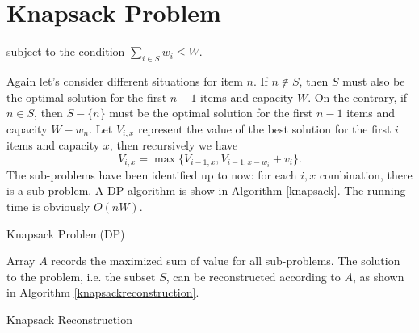 \section{Knapsack Problem}
\begin{description}
 subject to the condition $\sum\limits_{i\in S}w_i\leq W$.
\end{description}
Again let's consider different situations for item $n$. If $n\notin S$, then $S$ must also be the optimal solution for the first $n-1$ items and capacity $W$. On the contrary, if $n\in S$, then $S-\{n\}$ must be the optimal solution for the first $n-1$ items and capacity $W-w_n$. Let $V_{i,x}$ represent the value of the best solution for the first $i$ items and capacity $x$, then recursively we have 
$$V_{i,x}=\max\{V_{i-1,x},V_{i-1,x-w_i}+v_i\}.$$
The sub-problems have been identified up to now: for each $i,x$ combination, there is a sub-problem. A DP algorithm is show in Algorithm \ref{knapsack}. The running time is obviously $O(nW)$.

\begin{algorithm}[ht]
\caption{Knapsack Problem(DP)}\label{knapsack}
\begin{algorithmic}[1]
\Else{}
\EndIf\EndFor\EndFor
\end{algorithmic}
\end{algorithm}

Array $A$ records the maximized sum of value for all sub-problems. The solution to the problem, i.e. the subset $S$, can be reconstructed according to $A$, as shown in Algorithm \ref{knapsackreconstruction}.

\begin{algorithm}[ht]
\caption{Knapsack Reconstruction}\label{knapsackreconstruction}
\begin{algorithmic}[1]
\EndIf
{}
\EndWhile
\end{algorithmic}
\end{algorithm}

